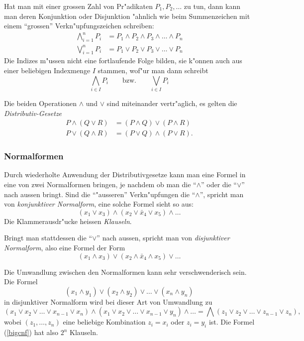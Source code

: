 Hat man mit einer grossen Zahl von Pr"adikaten $P_1,P_2,\dots$ zu tun,
dann kann man deren Konjunktion oder Disjunktion "ahnlich wie beim Summenzeichen
mit einem ``grossen'' Verkn"upfungszeichen schreiben:
\begin{align*}
\bigwedge_{i=1}^n P_i&=P_1\wedge P_2\wedge P_3\wedge\dots\wedge P_n\\
\bigvee_{i=1}^n P_i&=P_1\vee P_2\vee P_3\vee\dots\vee P_n
\end{align*}
Die Indizes m"ussen nicht eine fortlaufende Folge bilden, sie k"onnen
auch aus einer beliebigen Indexmenge $I$ stammen, wof"ur man dann
schreibt
\[
\bigwedge_{i\in I}P_i
\qquad
\text{bzw.}
\qquad
\bigvee_{i\in I}P_i
\]

Die beiden Operationen $\wedge$ und $\vee$ sind miteinander vertr"aglich,
es gelten die {\em Distributiv-Gesetze}
\begin{align*}
P\wedge(Q\vee R)&=(P\wedge Q)\vee (P\wedge R)\\
P\vee(Q\wedge R)&=(P\vee Q)\wedge (P\vee R).
\end{align*}

\subsubsection{Normalformen}
Durch wiederholte Anwendung der Distributivgesetze kann man 
eine Formel in eine von zwei Normalformen bringen, je nachdem
ob man die ``$\wedge$'' oder die ``$\vee$'' nach aussen bringt.
Sind die ``"ausseren'' Verkn"upfungen die ``$\wedge$'', spricht
man von {\em konjunktiver Normalform}, eine solche Formel sieht so aus:
\[
(x_1\vee x_3)\wedge(x_2\vee \bar x_4\vee x_5)\wedge\dots
\]
Die Klammerausdr"ucke heissen {\em Klauseln}.

Bringt man stattdessen die ``$\vee$'' nach aussen, spricht man von
{\em disjunktiver Normalform}, also eine Formel der Form
\[
(x_1\wedge x_3)\vee(x_2\wedge \bar x_4\wedge x_5)\vee\dots
\]

Die Umwandlung zwischen den Normalformen kann sehr verschwenderisch sein.
Die Formel
\[
(x_1\wedge y_1)\vee(x_2\wedge y_2)\vee\dots\vee (x_n\wedge y_n)
\]
in disjunktiver Normalform wird bei dieser Art von Umwandlung zu
\begin{equation}
(x_1\vee x_2\vee\dots\vee x_{n-1}\vee x_n)
\wedge
(x_1\vee x_2\vee\dots\vee x_{n-1}\vee y_n)
\wedge
\dots 
=\bigwedge (z_1\vee z_2\vee\dots \vee z_{n-1}\vee z_n),
\label{bigcnf}
\end{equation}
wobei $(z_1,\dots,z_n)$ eine beliebige Kombination $z_i=x_i$ oder $z_i=y_i$
ist. Die Formel (\ref{bigcnf}) hat also $2^n$ Klauseln.

